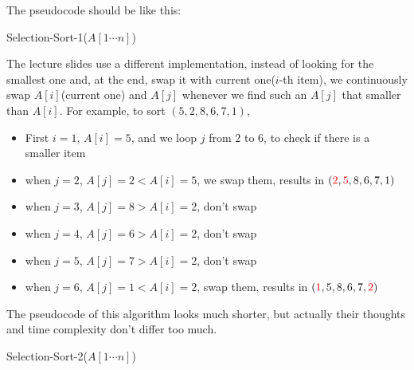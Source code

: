 \begin{spacing}{1.3}
    The pseudocode should be like this:
    \begin{algorithm*}[htbp]
        \caption{Selection-Sort-1($A[1\cdots n]$)}

    \end{algorithm*}

    The lecture slides use a different implementation, instead of looking 
    for the smallest one and, at the end, swap it with current one($i$-th item), 
    we continuously swap $A[i]$(current one) and $A[j]$ whenever we find 
    such an $A[j]$ that smaller than $A[i]$. For example, to sort $(5,2,8,6,7,1)$,
    \begin{itemize}
        \item First $i=1$, $A[i]=5$, and we loop $j$ from $2$ to $6$, to check if there 
        is a smaller item 
        \item when $j=2$, $A[j]=2<A[i]=5$, we swap them, results in $({\color{red} 2},{\color{red} 5},8,6,7,1)$
        \item when $j=3$, $A[j]=8>A[i]=2$, don't swap
        \item when $j=4$, $A[j]=6>A[i]=2$, don't swap
        \item when $j=5$, $A[j]=7>A[i]=2$, don't swap
        \item when $j=6$, $A[j]=1<A[i]=2$, swap them, results in $({\color{red} 1},5,8,6,7,{\color{red} 2})$
    \end{itemize}

    The pseudocode of this algorithm looks much shorter, but actually their thoughts 
    and time complexity don't differ too much.
    \begin{algorithm*}[htbp]
        \caption{Selection-Sort-2($A[1\cdots n]$)}


\end{algorithm*}
\end{spacing}
